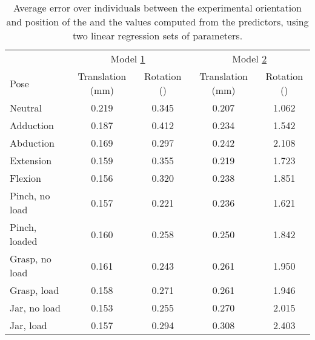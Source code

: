 \begin{table}[!ht]
	\centering
	\begin{tabular}{lcc|cc}
		\toprule
		\lun* & \multicolumn{2}{c}{Model \hyperref[model1]{1}} & \multicolumn{2}{c}{Model \hyperref[model2]{2}} \\
		Pose & Translation (mm) & Rotation (\degre) & Translation (mm) & Rotation (\degre) \\
		\midrule
		Neutral 		 & 0.219 	 & 0.345 	 & 0.207 	 & 1.062 \\
		Adduction 		 & 0.187 	 & 0.412 	 & 0.234 	 & 1.542 \\
		Abduction 		 & 0.169 	 & 0.297 	 & 0.242 	 & 2.108 \\
		Extension 		 & 0.159 	 & 0.355 	 & 0.219 	 & 1.723 \\
		Flexion 		 & 0.156 	 & 0.320 	 & 0.238 	 & 1.851 \\
		Pinch, no load 	 & 0.157 	 & 0.221 	 & 0.236 	 & 1.621 \\
		Pinch, loaded 	 & 0.160 	 & 0.258 	 & 0.250 	 & 1.842 \\
		Grasp, no load 	 & 0.161 	 & 0.243 	 & 0.261 	 & 1.950 \\
		Grasp, load 	 & 0.158 	 & 0.271 	 & 0.261 	 & 1.946 \\
		Jar, no load 	 & 0.153 	 & 0.255 	 & 0.270 	 & 2.015 \\
		Jar, load 		 & 0.157 	 & 0.294 	 & 0.308 	 & 2.403 \\
		\bottomrule
	\end{tabular}
	\caption[Generalization capacity of the statistical movement model for the \lun*]{Average error over individuals between the experimental orientation and position of the \lun* and the values computed from the predictors, using two linear regression sets of parameters.}
	\label{tab:linreg_lun}
\end{table}


